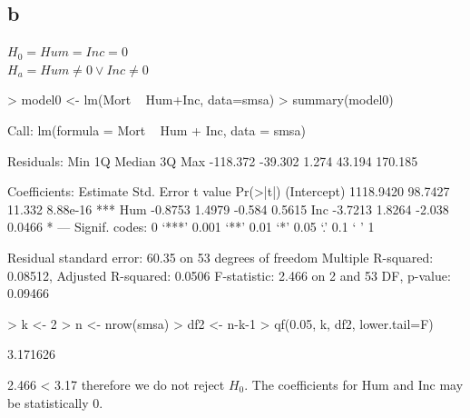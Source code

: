 \documentclass{article}
\begin{document}
\subsection*{b}
$H_0=Hum=Inc=0$
\\
$H_a=Hum\neq0 \lor Inc\neq0$
\begin{Schunk}
\begin{Sinput}
> model0 <- lm(Mort ~ Hum+Inc, data=smsa)
> summary(model0)
\end{Sinput}
\begin{Soutput}
Call:
lm(formula = Mort ~ Hum + Inc, data = smsa)

Residuals:
     Min       1Q   Median       3Q      Max 
-118.372  -39.302    1.274   43.194  170.185 

Coefficients:
             Estimate Std. Error t value Pr(>|t|)    
(Intercept) 1118.9420    98.7427  11.332 8.88e-16 ***
Hum           -0.8753     1.4979  -0.584   0.5615    
Inc           -3.7213     1.8264  -2.038   0.0466 *  
---
Signif. codes:  0 ‘***’ 0.001 ‘**’ 0.01 ‘*’ 0.05 ‘.’ 0.1 ‘ ’ 1

Residual standard error: 60.35 on 53 degrees of freedom
Multiple R-squared:  0.08512,	Adjusted R-squared:  0.0506 
F-statistic: 2.466 on 2 and 53 DF,  p-value: 0.09466
\end{Soutput}
\begin{Sinput}
> k <- 2
> n <- nrow(smsa)
> df2 <- n-k-1
> qf(0.05, k, df2, lower.tail=F)
\end{Sinput}
\begin{Soutput}
[1] 3.171626
\end{Soutput}
\end{Schunk}
2.466 < 3.17 therefore we do not reject $H_0$. The coefficients for Hum and Inc may be statistically 0.
\end{document}

